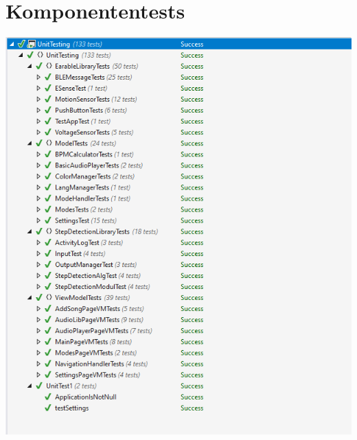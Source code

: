 \documentclass[../validierung.tex]{subfiles}
\begin{document}
\section{Komponententests}
	\includegraphics[width=\textwidth]{alleok.png}
\end{document}
